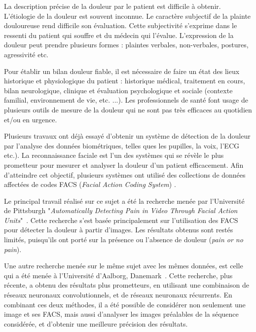 \documentclass[french]{article}
\begin{document}
La description précise de la douleur par le patient est difficile à obtenir.
L'étiologie de la douleur est souvent inconnue. Le caractère subjectif de la
plainte douloureuse rend difficile son évaluation. Cette subjectivité s'exprime
dans le ressenti du patient qui souffre et du médecin qui l'évalue. L’expression
de la douleur peut prendre plusieurs formes : plaintes verbales, non-verbales,
postures, agressivité etc.

Pour établir un bilan douleur fiable, il est nécessaire de faire un état des
lieux historique et physiologique du patient : historique médical, traitement en
cours, bilan neurologique, clinique et évaluation psychologique et sociale
(contexte familial, environnement de vie, etc. ...).
{\color{red}Les professionnels de santé font usage de plusieurs outils de mesure de la douleur qui ne sont pas très efficaces au quotidien et/ou en urgence.}

Plusieurs travaux  ont déjà essayé d’obtenir  un système de détection  de la
douleur par  l’analyse des  données biométriques, telles  ques les  pupilles, la
voix, l'ECG etc.). La reconnaissance faciale est l'un des systèmes qui se révèle
le  plus   prometteur  pour  mesurer   et  analyser  la  douleur   d'un  patient
efficacement.  Afin d’atteindre cet objectif, plusieurs systèmes ont utilisé des
collections  de données  affectées  de codes  FACS (\emph{Facial Action  Coding System}) \cite{lucey2011painful}.

Le  principal  travail  réalisé sur  ce  sujet  a  été  la recherche  menée  par
l’Université de Pittsburgh "\emph{Automatically  Detecting Pain in Video Through Facial  Action Units}"~\cite{lucey2011automatically}.
Cette  recherche s’est basée  principalement sur  l’utilisation des  FACS  pour
détecter  la douleur  à partir d'images. Les résultats obtenus sont restés
limités, puisqu'ils ont porté sur la présence ou l’absence de douleur (\emph{pain or
no pain}).

Une autre recherche  menée sur le même  sujet avec les mêmes  données, est celle
qui a été menée à l’Université d’Aalborg, Danemark~\cite{bellantonio2016spatio}.
 Cette  recherche, plus récente,  a obtenu des  résultats  plus  prometteurs,
en  utilisant  une  combinaison  de  réseaux neuronaux convolutionnels, et de
réseaux neuronaux récurrents.  En combinant ces deux méthodes, il  a été
possible de  considérer non seulement une  image et ses FACS, mais aussi
d’analyser les images  préalables de la séquence considérée, et d’obtenir  une
meilleure  précision  des  résultats.
\end{document}
